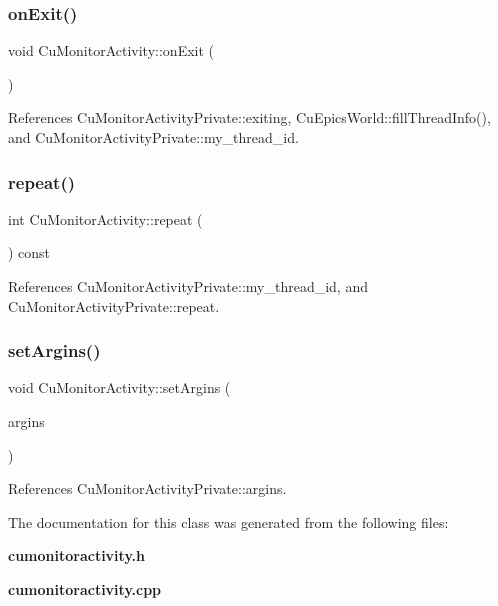 \mbox{\label{classCuMonitorActivity_a5a8aedf1f0e6ded9414b3757963f7776}} 
\subsubsection{on\+Exit()}
{\footnotesize\ttfamily void Cu\+Monitor\+Activity\+::on\+Exit (\begin{DoxyParamCaption}{ }\end{DoxyParamCaption})\hspace{0.3cm}{\ttfamily [protected]}}



References Cu\+Monitor\+Activity\+Private\+::exiting, Cu\+Epics\+World\+::fill\+Thread\+Info(), and Cu\+Monitor\+Activity\+Private\+::my\+\_\+thread\+\_\+id.

\mbox{\label{classCuMonitorActivity_aa39a0c8aa57dcd927559e151854b89be}} 
\subsubsection{repeat()}
{\footnotesize\ttfamily int Cu\+Monitor\+Activity\+::repeat (\begin{DoxyParamCaption}{ }\end{DoxyParamCaption}) const}



References Cu\+Monitor\+Activity\+Private\+::my\+\_\+thread\+\_\+id, and Cu\+Monitor\+Activity\+Private\+::repeat.

\mbox{\label{classCuMonitorActivity_a95f83be4a0bb5b48e2ed58660fab6c75}} 
\subsubsection{set\+Argins()}
{\footnotesize\ttfamily void Cu\+Monitor\+Activity\+::set\+Argins (\begin{DoxyParamCaption}\item[{const Cu\+Variant \&}]{argins }\end{DoxyParamCaption})}



References Cu\+Monitor\+Activity\+Private\+::argins.



The documentation for this class was generated from the following files\+:\begin{DoxyCompactItemize}
\item 
\textbf{ cumonitoractivity.\+h}\item 
\textbf{ cumonitoractivity.\+cpp}\end{DoxyCompactItemize}
